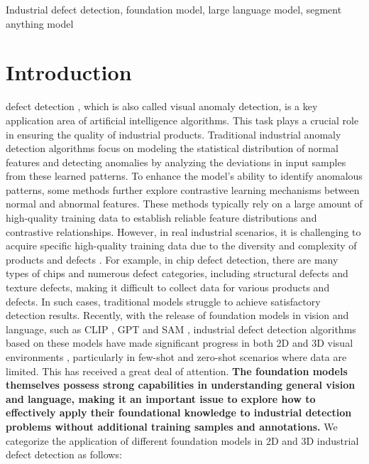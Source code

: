 \documentclass[journal,comsoc]{IEEEtran}
\begin{document}
\begin{IEEEkeywords}
Industrial defect detection, foundation model, large language model, segment anything model
\end{IEEEkeywords}







\IEEEpeerreviewmaketitle



\section{Introduction}

 defect detection \cite{pang2021deep}, which is also called visual anomaly detection, is a key application area of artificial intelligence algorithms. This task plays a crucial role in ensuring the quality of industrial products. Traditional industrial anomaly detection algorithms \cite{bergmann2018improving,gong2019memorizing,liu2021unsupervised,deng2022anomaly} focus on modeling the statistical distribution of normal features and detecting anomalies by analyzing the deviations in input samples from these learned patterns. To enhance the model’s ability to identify anomalous patterns, some methods \cite{liu2023simplenet,liang2024tocoad} further explore contrastive learning mechanisms \cite{hu2024comprehensive} between normal and abnormal features. These methods typically rely on a large amount of high-quality training data to establish reliable feature distributions and contrastive relationships. However, in real industrial scenarios, it is challenging to acquire specific high-quality training data due to the diversity and complexity of products and defects \cite{bergmann2019mvtec,zou2022spot,wang2024real}. For example, in chip defect detection, there are many types of chips and numerous defect categories, including structural defects and texture defects, making it difficult to collect data for various products and defects. In such cases, traditional models struggle to achieve satisfactory detection results. Recently, with the release of foundation models in vision and language, such as CLIP \cite{radford2021clip}, GPT \cite{zhu2023minigpt4,yang2023gpt4v} and SAM \cite{kirillov2023sam}, industrial defect detection algorithms based on these models have made significant progress in both 2D and 3D visual environments \cite{rani2024advancements}, particularly in few-shot and zero-shot scenarios where data are limited. This has received a great deal of attention. \textbf{The foundation models themselves possess strong capabilities in understanding general vision and language, making it an important issue to explore how to effectively apply their foundational knowledge to industrial detection problems without additional training samples and annotations. }
We categorize the application of different foundation models in 2D and 3D industrial defect detection as follows:
\end{document}
